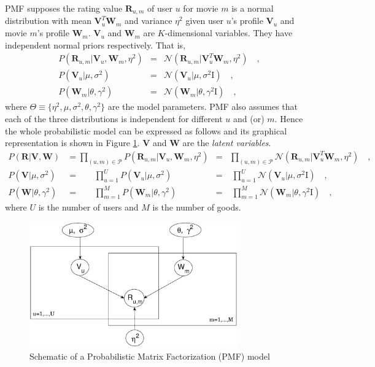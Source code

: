 \documentclass{article}
\begin{document}
PMF supposes the rating value $\pmb R_{u,m}$ of user $u$ for movie $m$ is a normal distribution
with mean $\pmb V_u^T\pmb W_m$ and variance $\eta^2$ given user $u$'s profile $\pmb V_u$ and movie $m$'s
profile $\pmb W_m$. $\pmb V_u$ and $\pmb W_m$ are $K$-dimensional variables.
They have independent normal priors respectively. That is,
\begin{eqnarray}
P(\pmb R_{u,m}|\pmb V_u, \pmb W_m, \eta^2) &=& \mathcal{N}(\pmb R_{u,m}|\pmb V_u^T\pmb W_m, \eta^2) \quad , \\
P(\pmb V_u|\mu, \sigma^2) &=& \mathcal{N}(\pmb V_u|\mu, \sigma^2 \text{I}) \quad, \\
P(\pmb W_m|\theta, \gamma^2) &=& \mathcal{N}(\pmb W_m|\theta, \gamma^2 \text{I}) \quad ,
\end{eqnarray}
where $\Theta\equiv\{\eta^2, \mu, \sigma^2, \theta, \gamma^2\}$ are the model parameters.
PMF also assumes that each of the three distributions is independent for different $u$ and (or) $m$.
Hence the whole probabilistic model can be expressed as follows and its graphical representation is
shown in Figure \ref{graph}.
$\pmb V$ and $\pmb W$ are the \textit{latent variables}.
\begin{align}
P(\pmb R|\pmb V,\pmb W) &= \prod_{(u,m)\in\mathcal{P}} P(\pmb R_{u,m}|\pmb V_u, \pmb W_m, \eta^2)
&=& \prod_{(u,m)\in\mathcal{P}} \mathcal{N}(\pmb R_{u,m}|\pmb V_u^T\pmb W_m, \eta^2) \quad , \\
P(\pmb V|\mu, \sigma^2)\; &= \;\;\;\quad\prod_{u=1}^U P(\pmb V_u|\mu, \sigma^2)
&=& \;\prod_{u=1}^U \mathcal{N}(\pmb V_u|\mu, \sigma^2 \text{I}) \quad, \\
P(\pmb W|\theta, \gamma^2)\; &= \;\;\;\quad\prod_{m=1}^M P(\pmb W_m|\theta, \gamma^2)
&=& \;\prod_{m=1}^M \mathcal{N}(\pmb W_m|\theta, \gamma^2 \text{I}) \quad ,
\end{align}
where $U$ is the number of users and $M$ is the number of goods.
\begin{figure}[h]
    \centering
    \includegraphics[trim=-10 40 0 0, clip, width=0.80\textwidth]{oriPMF.eps}
    \caption{Schematic of a Probabilistic Matrix Factorization (PMF) model}\label{graph}
\end{figure}
\end{document}
